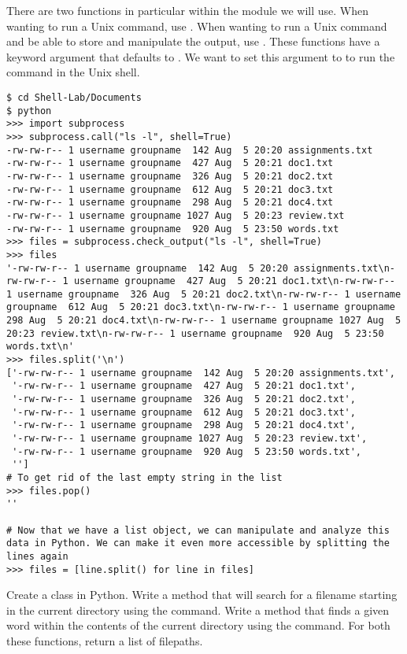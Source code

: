 There are two functions in particular within the  module we will use. When wanting to run a Unix command, use . 
When wanting to run a Unix command and be able to store and manipulate the output, use . 
These functions have a keyword argument  that defaults to . We want to set this argument to  to run the command in the Unix shell.

\begin{lstlisting}
$ cd Shell-Lab/Documents
$ python
>>> import subprocess
>>> subprocess.call("ls -l", shell=True)
-rw-rw-r-- 1 username groupname  142 Aug  5 20:20 assignments.txt
-rw-rw-r-- 1 username groupname  427 Aug  5 20:21 doc1.txt
-rw-rw-r-- 1 username groupname  326 Aug  5 20:21 doc2.txt
-rw-rw-r-- 1 username groupname  612 Aug  5 20:21 doc3.txt
-rw-rw-r-- 1 username groupname  298 Aug  5 20:21 doc4.txt
-rw-rw-r-- 1 username groupname 1027 Aug  5 20:23 review.txt
-rw-rw-r-- 1 username groupname  920 Aug  5 23:50 words.txt
>>> files = subprocess.check_output("ls -l", shell=True)
>>> files
'-rw-rw-r-- 1 username groupname  142 Aug  5 20:20 assignments.txt\n-rw-rw-r-- 1 username groupname  427 Aug  5 20:21 doc1.txt\n-rw-rw-r-- 1 username groupname  326 Aug  5 20:21 doc2.txt\n-rw-rw-r-- 1 username groupname  612 Aug  5 20:21 doc3.txt\n-rw-rw-r-- 1 username groupname  298 Aug  5 20:21 doc4.txt\n-rw-rw-r-- 1 username groupname 1027 Aug  5 20:23 review.txt\n-rw-rw-r-- 1 username groupname  920 Aug  5 23:50 words.txt\n'
>>> files.split('\n')
['-rw-rw-r-- 1 username groupname  142 Aug  5 20:20 assignments.txt',
 '-rw-rw-r-- 1 username groupname  427 Aug  5 20:21 doc1.txt',
 '-rw-rw-r-- 1 username groupname  326 Aug  5 20:21 doc2.txt',
 '-rw-rw-r-- 1 username groupname  612 Aug  5 20:21 doc3.txt',
 '-rw-rw-r-- 1 username groupname  298 Aug  5 20:21 doc4.txt',
 '-rw-rw-r-- 1 username groupname 1027 Aug  5 20:23 review.txt',
 '-rw-rw-r-- 1 username groupname  920 Aug  5 23:50 words.txt',
 '']
# To get rid of the last empty string in the list
>>> files.pop()
''

# Now that we have a list object, we can manipulate and analyze this data in Python. We can make it even more accessible by splitting the lines again
>>> files = [line.split() for line in files]
\end{lstlisting}

\begin{problem}
Create a  class in Python. Write a  method that will search for a filename starting in the current directory using the  command. Write a  method that finds a given word within the contents of the current directory using the  command. For both these functions, return a list of filepaths.
\end{problem}

